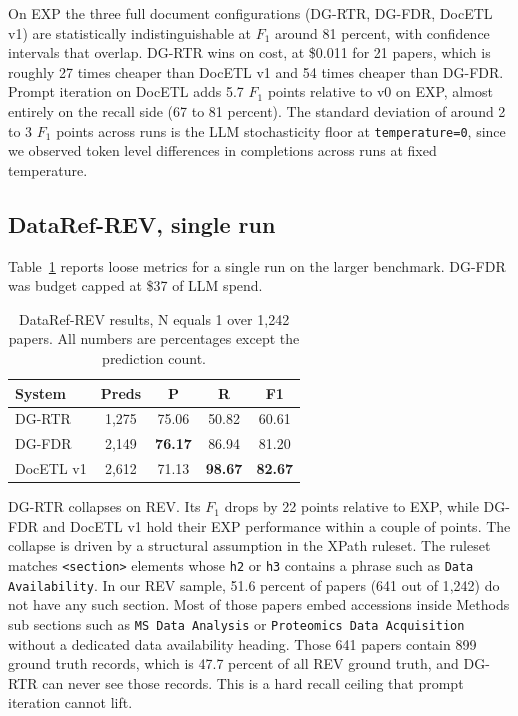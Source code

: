 \documentclass[sigconf,nonacm]{acmart}
\begin{document}
On EXP the three full document configurations (DG-RTR, DG-FDR, DocETL v1) are statistically indistinguishable at $F_1$ around 81 percent, with confidence intervals that overlap. DG-RTR wins on cost, at \$0.011 for 21 papers, which is roughly 27 times cheaper than DocETL v1 and 54 times cheaper than DG-FDR. Prompt iteration on DocETL adds 5.7 $F_1$ points relative to v0 on EXP, almost entirely on the recall side (67 to 81 percent). The standard deviation of around 2 to 3 $F_1$ points across runs is the LLM stochasticity floor at \texttt{temperature=0}, since we observed token level differences in completions across runs at fixed temperature.

\subsection{DataRef-REV, single run}

Table~\ref{tab:rev} reports loose metrics for a single run on the larger benchmark. DG-FDR was budget capped at \$37 of LLM spend.

\begin{table}[h]
\centering
\small
\begin{tabular}{lcccc}
\toprule
\textbf{System} & \textbf{Preds} & \textbf{P} & \textbf{R} & \textbf{F1} \\
\midrule
DG-RTR     & 1{,}275 & 75.06 & 50.82 & 60.61 \\
DG-FDR     & 2{,}149 & \textbf{76.17} & 86.94 & 81.20 \\
DocETL v1  & 2{,}612 & 71.13 & \textbf{98.67} & \textbf{82.67} \\
\bottomrule
\end{tabular}
\caption{DataRef-REV results, N equals 1 over 1{,}242 papers. All numbers are percentages except the prediction count.}
\label{tab:rev}
\end{table}

DG-RTR collapses on REV. Its $F_1$ drops by 22 points relative to EXP, while DG-FDR and DocETL v1 hold their EXP performance within a couple of points. The collapse is driven by a structural assumption in the XPath ruleset. The ruleset matches \texttt{<section>} elements whose \texttt{h2} or \texttt{h3} contains a phrase such as \texttt{Data Availability}. In our REV sample, 51.6 percent of papers (641 out of 1{,}242) do not have any such section. Most of those papers embed accessions inside Methods sub sections such as \texttt{MS Data Analysis} or \texttt{Proteomics Data Acquisition} without a dedicated data availability heading. Those 641 papers contain 899 ground truth records, which is 47.7 percent of all REV ground truth, and DG-RTR can never see those records. This is a hard recall ceiling that prompt iteration cannot lift.
\end{document}
